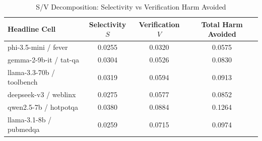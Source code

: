 \begin{table}[h]
\centering
\small
\caption{S/V Decomposition: Selectivity vs Verification Harm Avoided}
\label{tab:validation_preview_sv_decomposition}
\begin{tabular}{l|cc|c}
\hline
Headline Cell & Selectivity $S$ & Verification $V$ & Total Harm Avoided \\
\hline
phi-3.5-mini / fever & 0.0255 & 0.0320 & 0.0575 \\
gemma-2-9b-it / tat-qa & 0.0304 & 0.0526 & 0.0830 \\
llama-3.3-70b / toolbench & 0.0319 & 0.0594 & 0.0913 \\
deepseek-v3 / weblinx & 0.0275 & 0.0577 & 0.0852 \\
qwen2.5-7b / hotpotqa & 0.0380 & 0.0884 & 0.1264 \\
llama-3.1-8b / pubmedqa & 0.0259 & 0.0715 & 0.0974 \\
\hline
\end{tabular}
\end{table}
